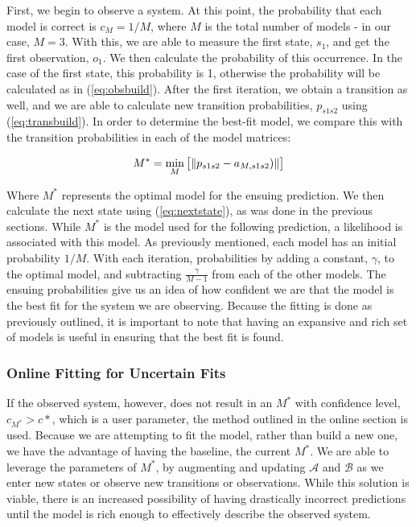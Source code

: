 \documentclass[conference]{IEEEtran}
\begin{document}
First, we begin to observe a system. At this point, the probability that each model is correct is $c_M = 1/M$, where $M$ is the total number of models - in our case, $M = 3$. With this, we are able to measure the first state, $s_1$, and get the first observation, $o_1$. We then calculate the probability of this occurrence. In the case of the first state, this probability is 1, otherwise the probability will be calculated as in (\ref{eq:obsbuild}). After the first iteration, we obtain a transition as well, and we are able to calculate new transition probabilities, $p_{s1s2}$ using (\ref{eq:transbuild}). In order to determine the best-fit model, we compare this with the transition probabilities in each of the model matrices:

\begin{equation} \label{probdist}
    M^* = \min_M\big[\lVert p_{s1s2} - a_{M,s1s2})\rVert\big] \newline
\end{equation}

Where $M^*$ represents the optimal model for the ensuing prediction. We then calculate the next state using (\ref{eq:nextstate}), as was done in the previous sections. While $M^*$ is the model used for the following prediction, a likelihood is associated with this model. As previously mentioned, each model has an initial probability $1/M$. With each iteration, probabilities by adding a constant, $\gamma$, to the optimal model, and subtracting $\frac{\gamma}{M-1}$ from each of the other models. The ensuing probabilities give us an idea of how confident we are that the model is the best fit for the system we are observing. Because the fitting is done as previously outlined, it is important to note that having an expansive and rich set of models is useful in ensuring that the best fit is found.

\subsubsection{Online Fitting for Uncertain Fits}
If the observed system, however, does not result in an $M^*$ with confidence level, $c_{M^{*}} > c*$, which is a user parameter, the method outlined in the online section is used. Because we are attempting to fit the model, rather than build a new one, we have the advantage of having the baseline, the current $M^*$. We are able to leverage the parameters of $M^*$, by augmenting and updating $\mathcal{A}$ and $\mathcal{B}$ as we enter new states or observe new transitions or observations. While this solution is viable, there is an increased possibility of having drastically incorrect predictions until the model is rich enough to effectively describe the observed system.
\end{document}
